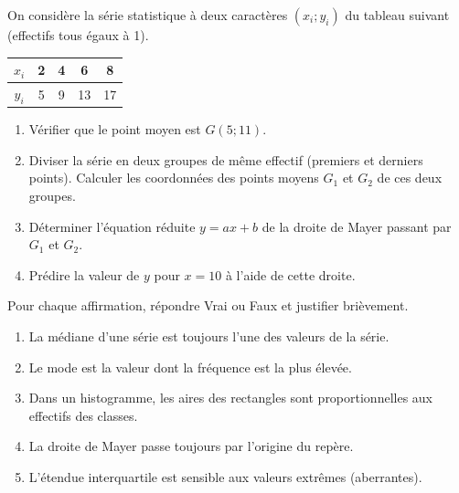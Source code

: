 \documentclass[11pt]{article}
\begin{document}
\begin{exercice}
On considère la série statistique à deux caractères $(x_i; y_i)$ du tableau suivant (effectifs tous égaux à 1).
\begin{center}
\begin{tabular}{|c|c|c|c|c|}
\hline
$x_i$ & 2 & 4 & 6 & 8 \\
\hline
$y_i$ & 5 & 9 & 13 & 17 \\
\hline
\end{tabular}
\end{center}
\begin{enumerate}
    \item Vérifier que le point moyen est $G(5; 11)$.
    \item Diviser la série en deux groupes de même effectif (premiers et derniers points). Calculer les coordonnées des points moyens $G_1$ et $G_2$ de ces deux groupes.
    \item Déterminer l'équation réduite $y = ax + b$ de la droite de Mayer passant par $G_1$ et $G_2$.
    \item Prédire la valeur de $y$ pour $x = 10$ à l'aide de cette droite.
\end{enumerate}
\end{exercice}

\begin{exercice}
Pour chaque affirmation, répondre Vrai ou Faux et justifier brièvement.
\begin{enumerate}
    \item La médiane d'une série est toujours l'une des valeurs de la série.
    \item Le mode est la valeur dont la fréquence est la plus élevée.
    \item Dans un histogramme, les aires des rectangles sont proportionnelles aux effectifs des classes.
    \item La droite de Mayer passe toujours par l'origine du repère.
    \item L'étendue interquartile est sensible aux valeurs extrêmes (aberrantes).
\end{enumerate}
\end{exercice}
\end{document}
